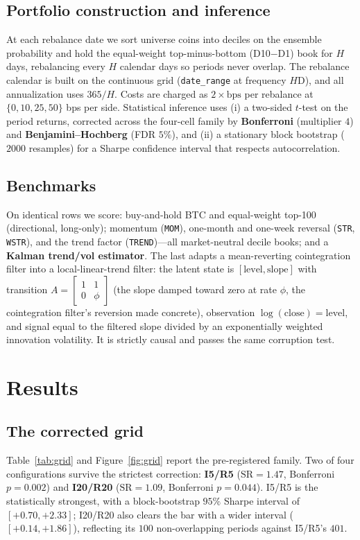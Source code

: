 \documentclass[11pt]{article}
\newcommand{\sharpe}{\ensuremath{\mathrm{SR}}}
\begin{document}
\subsection{Portfolio construction and inference}
At each rebalance date we sort universe coins into deciles on the ensemble probability and hold the
equal-weight top-minus-bottom (D10$-$D1) book for $H$ days, rebalancing every $H$ calendar days so
periods never overlap. The rebalance calendar is built on the continuous grid
(\texttt{date\_range} at frequency $H$D), and all annualization uses $365/H$. Costs are charged as
$2\times\text{bps}$ per rebalance at $\{0,10,25,50\}$ bps per side. Statistical inference uses
(i) a two-sided $t$-test on the period returns, corrected across the four-cell family by
\textbf{Bonferroni} (multiplier $4$) and \textbf{Benjamini--Hochberg} (FDR $5\%$), and (ii) a
stationary block bootstrap ($2000$ resamples) for a Sharpe confidence interval that respects
autocorrelation.

\subsection{Benchmarks}
On identical rows we score: buy-and-hold BTC and equal-weight top-100 (directional, long-only);
momentum (\texttt{MOM}), one-month and one-week reversal (\texttt{STR}, \texttt{WSTR}), and the
\citet{han2016trend} trend factor (\texttt{TREND})---all market-neutral decile books; and a
\textbf{Kalman trend/vol estimator}. The last adapts a mean-reverting cointegration filter into a
local-linear-trend filter: the latent state is $[\text{level},\text{slope}]$ with transition
$A=\left[\begin{smallmatrix}1&1\\0&\phi\end{smallmatrix}\right]$ (the slope damped toward zero at
rate $\phi$, the cointegration filter's reversion made concrete), observation
$\log(\text{close})=\text{level}$, and signal equal to the filtered slope divided by an
exponentially weighted innovation volatility. It is strictly causal and passes the same corruption
test.

\section{Results}

\subsection{The corrected grid}
Table~\ref{tab:grid} and Figure~\ref{fig:grid} report the pre-registered family. Two of four
configurations survive the strictest correction: \textbf{I5/R5} ($\sharpe=1.47$, Bonferroni
$p=0.002$) and \textbf{I20/R20} ($\sharpe=1.09$, Bonferroni $p=0.044$). I5/R5 is the statistically
strongest, with a block-bootstrap $95\%$ Sharpe interval of $[+0.70,+2.33]$; I20/R20 also clears the
bar with a wider interval ($[+0.14,+1.86]$), reflecting its $100$ non-overlapping periods against
I5/R5's $401$.
\end{document}
